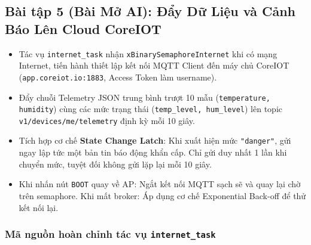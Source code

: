 \subsection{Bài tập 5 (Bài Mở AI): Đẩy Dữ Liệu và Cảnh Báo Lên Cloud CoreIOT}

\begin{tcolorbox}[
    enhanced, colback=black!2, colframe=black!60, boxrule=1pt, arc=2.5mm, drop shadow,
    attach boxed title to top left={xshift=4mm, yshift=-3mm},
    boxed title style={enhanced, colback=black!85, colframe=black!85, boxrule=1pt, arc=2.5mm, drop shadow, left=6pt, right=6pt, top=2pt, bottom=2pt},
    title=\textcolor{white}{\large\textbf{Yêu cầu kỹ thuật Bài tập 5}}
]
\bfseries
\vspace{0.2cm}
\begin{itemize}
    \item Tác vụ \texttt{internet\_task} nhận \texttt{xBinarySemaphoreInternet} khi có mạng Internet, tiến hành thiết lập kết nối MQTT Client đến máy chủ CoreIOT (\texttt{app.coreiot.io:1883}, Access Token làm username).
    \item Đẩy chuỗi Telemetry JSON trung bình trượt 10 mẫu (\texttt{temperature, humidity}) cùng các mức trạng thái (\texttt{temp\_level, hum\_level}) lên topic \texttt{v1/devices/me/telemetry} định kỳ mỗi 10 giây.
    \item Tích hợp cơ chế \textbf{State Change Latch}: Khi xuất hiện mức \texttt{"danger"}, gửi ngay lập tức một bản tin báo động khẩn cấp. Chỉ gửi duy nhất 1 lần khi chuyển mức, tuyệt đối không gửi lặp lại mỗi 10 giây.
    \item Khi nhấn nút \texttt{BOOT} quay về AP: Ngắt kết nối MQTT sạch sẽ và quay lại chờ trên semaphore. Khi mất broker: Áp dụng cơ chế Exponential Back-off để thử kết nối lại.
\end{itemize}
\end{tcolorbox}

\subsubsection{Mã nguồn hoàn chỉnh tác vụ \texttt{internet\_task}}

